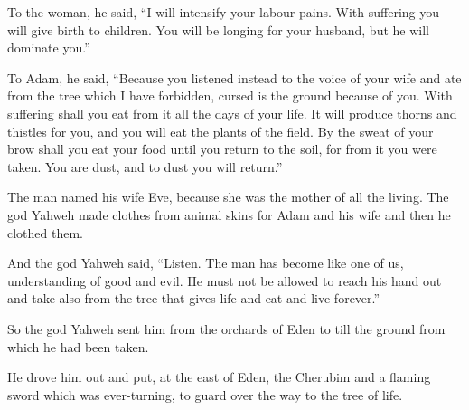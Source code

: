 To the woman, he said, 
\enquote{I will intensify your labour pains. 
With suffering you will give birth to children. 
You will be longing for your husband, but he will dominate you.} 

To Adam, he said, 
\enquote{Because you listened instead to the voice of your wife 
and ate from the tree which I have forbidden, 
cursed is the ground because of you. 
With suffering shall you eat from it all the days of your life. 
It will produce thorns and thistles for you, 
and you will eat the plants of the field. 
By the sweat of your brow shall you eat your food 
until you return to the soil, for from it you were taken. 
You are dust, and to dust you will return.}

The man named his wife Eve, because she was the mother of all the living. 
The god Yahweh made clothes from animal skins for Adam and his wife 
and then he clothed them.

And the god Yahweh said, 
\enquote{Listen. 
The man has become like one of us, 
understanding of good and evil. 
He must not be allowed to reach his hand out 
and take also from the tree that gives life and eat and live forever.}

So the god Yahweh sent him from the orchards of Eden 
to till the ground from which he had been taken.

He drove him out and put, at the east of Eden, 
the Cherubim and a flaming sword which was ever-turning, 
to guard over the way to the tree of life.
